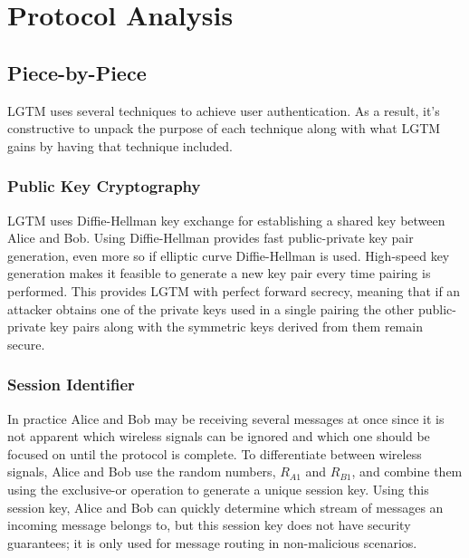 \documentclass[12pt]{report}
\begin{document}
\section{Protocol Analysis}
\subsection{Piece-by-Piece}
LGTM uses several techniques to achieve user authentication. As a result, it's constructive to unpack the purpose of each technique along with what LGTM gains by having that technique included. \par

\subsubsection{Public Key Cryptography}
LGTM uses Diffie-Hellman key exchange \cite{DiffieHellman2006} for establishing a shared key between Alice and Bob. Using Diffie-Hellman provides fast public-private key pair generation, even more so if elliptic curve Diffie-Hellman is used. High-speed key generation makes it feasible to generate a new key pair every time pairing is performed. This provides LGTM with perfect forward secrecy, meaning that if an attacker obtains one of the private keys used in a single pairing the other public-private key pairs along with the symmetric keys derived from them remain secure. \par

\subsubsection{Session Identifier}
In practice Alice and Bob may be receiving several messages at once since it is not apparent which wireless signals can be ignored and which one should be focused on until the protocol is complete. To differentiate between wireless signals, Alice and Bob use the random numbers, $R_{A1}$ and $R_{B1}$, and combine them using the exclusive-or operation to generate a unique session key. Using this session key, Alice and Bob can quickly determine which stream of messages an incoming message belongs to, but this session key does not have security guarantees; it is only used for message routing in non-malicious scenarios. \par
\end{document}
